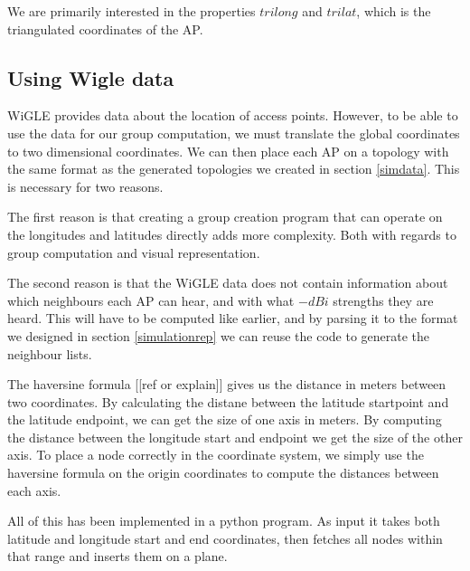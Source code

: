 We are primarily interested in the properties $trilong$ and $trilat$, which is
the triangulated coordinates of the AP. 

\subsection{Using Wigle data}
WiGLE provides data about the location of access points. However, to be able to
use the data for our group computation, we must translate the global coordinates
to two dimensional coordinates. We can then place each AP on a topology with the
same format as the generated topologies we created in section \ref{simdata}.
This is necessary for two reasons.

The first reason is that creating a group creation program that can operate
on the longitudes and latitudes directly adds more complexity. Both with regards to
group computation and visual representation. 

The second reason is that the WiGLE data does not contain information about
which neighbours each AP can hear, and with what $-dBi$ strengths they are heard.
This will have to be computed like earlier, and by parsing it to the format
we designed in section \ref{simulationrep} we can reuse the code to generate the neighbour lists.

The haversine formula [[ref or explain]] gives us the distance in meters between two coordinates. By calculating
the distane between the latitude startpoint and the latitude endpoint, we can get the size of one
axis in meters. By computing the distance between the longitude start and endpoint we get the size of the
other axis. To place a node correctly in the coordinate system, we simply use the haversine formula on the
origin coordinates to compute the distances between each axis. 

All of this has been implemented in a python program. As input it takes both latitude and longitude start and end coordinates,
    then fetches all nodes within that range and inserts them on a plane. 


